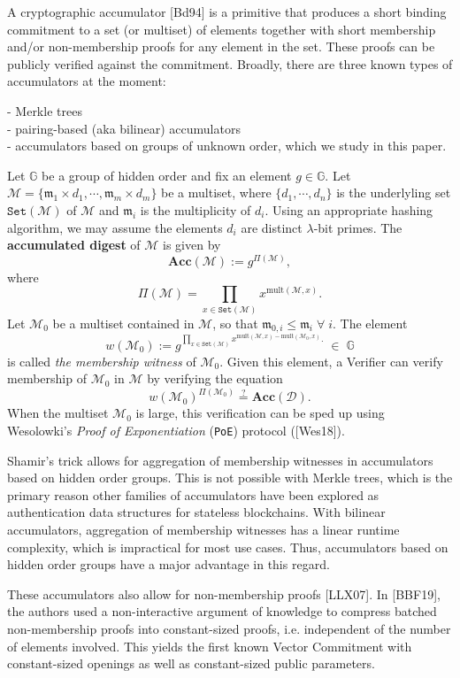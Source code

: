 \documentclass[11pt, lettersize, notitlepage, leqno, footskip=0.6cm]{article}
\newcommand{\pl}{\prod\limits}
\newcommand{\ttt}{\texttt}
\newcommand{\Acc}{\mbf{Acc}}
\newcommand{\sett}{\ttt{Set}}
\newcommand{\mult}{\mr{mult}}
\newcommand{\mc}{\mathcal}
\newcommand{\mb}{\mathbb}
\newcommand{\mbf}{\mathbf}
\newcommand{\mr}{\mathrm}
\newcommand{\mfm}{\mathfrak{m}}
\newcommand{\lam}{\lambda}
\newcommand{\vs}{\vspace{-0.15cm}}
\newcommand{\noin}{\noindent}
\newcommand{\sta}{\stackrel{?}{=}}
\numberwithin{equation}{section}
\begin{document}
A cryptographic accumulator [Bd94] is a primitive that produces a short binding commitment to a set (or multiset) of elements together with short membership and/or non-membership proofs for any element in the set. These proofs can be publicly verified against the commitment. Broadly, there are three known types of accumulators at the moment: 

\noin - Merkle trees\\
- pairing-based (aka bilinear) accumulators \\  
- accumulators based on groups of unknown order, which we study in this paper. 

Let $\mb{G}$ be a group of hidden order and fix an element $g \in\mb{G}$. Let $\mc{M}= \{\mfm_1\times d_1,\cdots, \mfm_m\times d_m\}$ be a multiset, where $\{d_1,\cdots, d_n \}$ is the underlyling set $\sett(\mc{M})$ of $\mc{M}$ and $\mfm_i$ is the multiplicity of $d_i$. Using an appropriate hashing algorithm, we may assume the elements $d_i$ are distinct $\lam$-bit primes. The \textbf{accumulated digest} of $\mc{M}$ is given by \vs $$\Acc(\mc{M}):= g^{\Pi(\mc{M})} ,$$ where $$\Pi(\mc{M}) = \pl_{x\in \sett(\mc{M})} x^{\mult(\mc{M},x)} .$$ Let $\mc{M}_0$ be a multiset contained in $\mc{M}$, so that  $\mfm_{0,i}\leq \mfm_i\;\forall\;i$. The element \vs $$w(\mc{M}_0):= g^{\pl_{x\in \sett(\mc{M})} x^{\mult(\mc{M},x)-\mult(\mc{M}_0,x)} .}\;\in\;\mb{G} $$ is called \textit{the membership witness} of $\mc{M}_0$. Given this element, a Verifier can verify membership of $\mc{M}_0$ in $\mc{M}$ by verifying the equation \vs $$w(\mc{M}_0)^{\Pi(\mc{M}_0)} \sta \Acc(\mc{D}).$$ When the multiset $\mc{M}_0$ is large, this verification can be sped up using Wesolowki's \textit{Proof of Exponentiation} (\verb|PoE|) protocol ([Wes18]).

Shamir's trick allows for aggregation of membership witnesses in accumulators based on hidden order groups. This is not possible with Merkle trees, which is the primary reason other families of accumulators have been explored as authentication data structures for stateless blockchains. With bilinear accumulators, aggregation of membership witnesses has a linear runtime complexity, which is impractical for most use cases. Thus, accumulators based on hidden order groups have a major advantage in this regard.

These accumulators also allow for non-membership proofs [LLX07]. In [BBF19], the authors used a non-interactive argument of knowledge to compress batched non-membership proofs into constant-sized proofs, i.e. independent of the number of elements involved. This yields the first known Vector Commitment with constant-sized openings as well as  constant-sized public parameters.\vspace{0.1cm}
\end{document}
